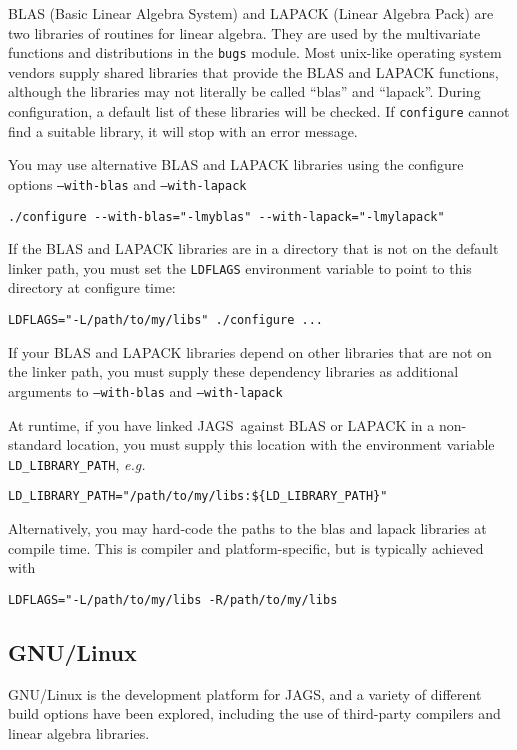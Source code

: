 \documentclass[11pt, a4paper, titlepage]{article}
\newcommand{\JAGS}{\textsf{JAGS}}
\begin{document}
BLAS (Basic Linear Algebra System) and LAPACK (Linear Algebra Pack)
are two libraries of routines for linear algebra. They are used by the
multivariate functions and distributions in the \texttt{bugs} module.
Most unix-like operating system vendors supply shared libraries that
provide the BLAS and LAPACK functions, although the libraries may not
literally be called ``blas'' and ``lapack''.  During configuration, a
default list of these libraries will be checked. If \texttt{configure}
cannot find a suitable library, it will stop with an error message.

You may use alternative BLAS and LAPACK libraries using the configure
options \texttt{--with-blas} and \texttt{--with-lapack}
\begin{verbatim}
./configure --with-blas="-lmyblas" --with-lapack="-lmylapack"
\end{verbatim}

If the BLAS and LAPACK libraries are in a directory that is not on the
default linker path, you must set the \verb+LDFLAGS+ environment variable
to point to this directory at configure time:
\begin{verbatim}
LDFLAGS="-L/path/to/my/libs" ./configure ...
\end{verbatim}
If your BLAS and LAPACK libraries depend on other libraries that are
not on the linker path, you must supply these dependency libraries as
additional arguments to \texttt{--with-blas} and
\texttt{--with-lapack} 

At runtime, if you have linked \JAGS\ against BLAS or LAPACK in
a non-standard location, you must supply this location with the
environment variable \verb+LD_LIBRARY_PATH+, {\em e.g.}
\begin{verbatim}
LD_LIBRARY_PATH="/path/to/my/libs:${LD_LIBRARY_PATH}"
\end{verbatim} %
Alternatively, you may hard-code the paths to the blas and lapack
libraries at compile time. This is compiler and platform-specific,
but is typically achieved with
\begin{verbatim}
LDFLAGS="-L/path/to/my/libs -R/path/to/my/libs
\end{verbatim}

\subsection{GNU/Linux}
\label{section:gnulinux}

GNU/Linux is the development platform for \JAGS, and a variety of
different build options have been explored, including the use of
third-party compilers and linear algebra libraries.
\end{document}
